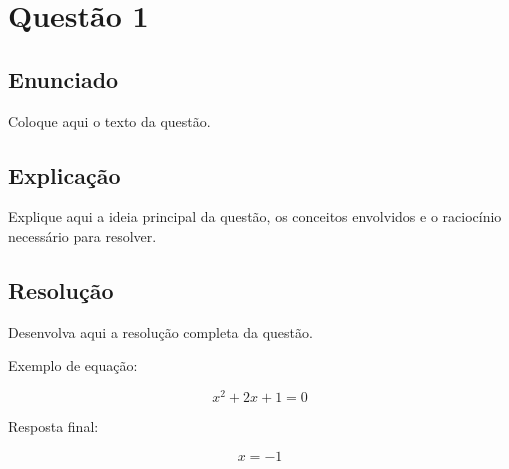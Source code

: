 \section{Questão 1}

\subsection{Enunciado}

Coloque aqui o texto da questão.

\vspace{0.5cm}

\subsection{Explicação}

Explique aqui a ideia principal da questão, os conceitos envolvidos e o raciocínio necessário para resolver.

\vspace{0.5cm}

\subsection{Resolução}

Desenvolva aqui a resolução completa da questão.

Exemplo de equação:

\[
x^2 + 2x + 1 = 0
\]

Resposta final:

\[
x = -1
\]